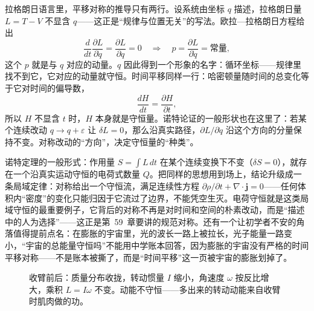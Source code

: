 \begin{mathbridge}
拉格朗日语言里，平移对称的推导只有两行。设系统由坐标 \(q\) 描述，拉格朗日量 \(L=T-V\) 不显含 \(q\)——这正是“规律与位置无关”的写法。欧拉—拉格朗日方程给出
\[
\frac{d}{dt}\frac{\partial L}{\partial \dot q}=\frac{\partial L}{\partial q}=0
\quad\Longrightarrow\quad
p=\frac{\partial L}{\partial \dot q}=\text{常量},
\]
这个 \(p\) 就是与 \(q\) 对应的动量。\(q\) 因此得到一个形象的名字：循环坐标——规律里找不到它，它对应的动量就守恒。时间平移同样一行：哈密顿量随时间的总变化等于它对时间的偏导数，
\[
\frac{dH}{dt}=\frac{\partial H}{\partial t},
\]
所以 \(H\) 不显含 \(t\) 时，\(H\) 本身就是守恒量。诺特论证的一般形状也在这里了：若某个连续改动 \(q\to q+\varepsilon\) 让 \(\delta L=0\)，那么沿真实路径，\(\partial L/\partial \dot q\) 沿这个方向的分量保持不变。对称改动的“方向”，决定守恒量的“种类”。
\end{mathbridge}

\begin{challenge}
诺特定理的一般形式：作用量 \(S=\int L\,dt\) 在某个连续变换下不变（\(\delta S=0\)），就存在一个沿真实运动守恒的电荷式数量 \(Q\)。把同样的思想用到场上，结论升级成一条局域定律：对称给出一个守恒流，满足连续性方程 \(\partial\rho/\partial t+\nabla\!\cdot\!\mathbf j=0\)——任何体积内“密度”的变化只能归因于它流过了边界，不能凭空生灭。电荷守恒就是这类局域守恒的最重要例子，它背后的对称不再是对时间和空间的朴素改动，而是“描述中的人为选择”——这正是第~59~章要讲的规范对称。还有一个让初学者不安的角落值得提前点名：在膨胀的宇宙里，光的波长一路上被拉长，光子能量一路变小，“宇宙的总能量守恒吗”不能用中学账本回答，因为膨胀的宇宙没有严格的时间平移对称——不是账本被撕了，而是“时间平移”这一页被宇宙的膨胀划掉了。
\end{challenge}

\begin{figure}[htbp]
\centering
{}
\caption{收臂前后：质量分布收拢，转动惯量 \(I\) 缩小，角速度 \(\omega\) 按反比增大，乘积 \(L=I\omega\) 不变。动能不守恒——多出来的转动动能来自收臂时肌肉做的功。}
\end{figure}

